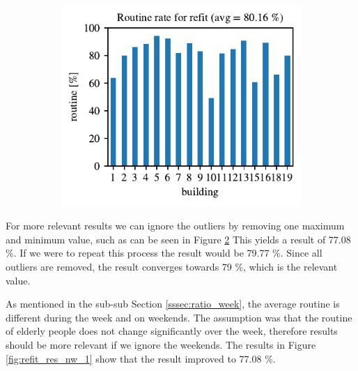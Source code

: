 \begin{figure}[H]
\begin{subfigure}{.5\textwidth}
        \includegraphics[width=1\textwidth]{Figures/EC/refit_res2.pdf}
        \label{fig:refit_res2}
    \end{subfigure}
\end{figure}

For more relevant results we can ignore the outliers by removing one maximum and minimum value, such as can be seen in Figure \ref{fig:refit_res2}
This yields a result of 77.08 \%.
If we were to repeat this process the result would be 79.77 \%.
Since all outliers are removed, the result converges towards 79 \%, which is the relevant value. 


As mentioned in the sub-sub Section \ref{sssec:ratio_week}, the average routine is different during the week and on weekends.
The assumption was that the routine of elderly people does not change significantly over the week, therefore results should be more relevant if we ignore the weekends.
The results in Figure \ref{fig:refit_res_nw_1} show that the result improved to 77.08 \%.

